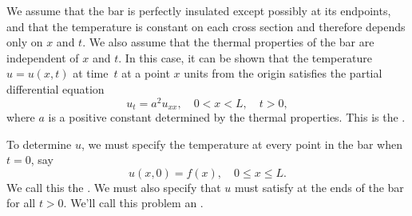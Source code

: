 We assume that the bar is perfectly insulated except possibly at
its endpoints, and that the
temperature is constant on each cross section and therefore
depends only on $x$ and $t$. We also assume that the thermal
properties of the bar are independent of $x$ and $t$. In this case, it
can be shown that the temperature $u=u(x,t)$ at time~$t$ at a point
$x$ units from the origin satisfies the partial differential equation
\[
u_t=a^2u_{xx},\quad 0<x<L,\quad t>0,
\]
where $a$ is a positive constant determined by the thermal properties.
This is the .

To determine $u$, we must specify the temperature at every
point in the bar when $t=0$, say
\[
u(x,0)=f(x),\quad 0\le x\le L.
\]
We call this the .
We must also specify
that
$u$ must satisfy at the ends of the bar for all $t>0$.
We'll call this problem an
.

